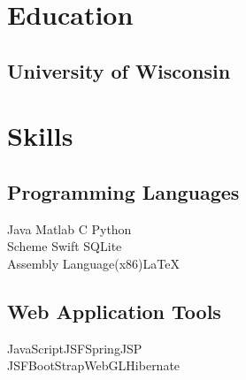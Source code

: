 \documentclass[]{deedy-resume-openfont}
\begin{document}
%
%
\lastupdated

%
%

%
%

\begin{minipage}[t]{0.33\textwidth} 


\section{Education} 

\subsection{University of Wisconsin}
\sectionsep





\section{Skills}
\subsection{Programming Languages}
Java \textbullet{} Matlab \textbullet{} C \textbullet{} Python \\ 
Scheme \textbullet{} Swift \textbullet{} SQLite 	\\
Assembly Language(x86)\textbullet{}\LaTeX\
\sectionsep

\subsection{Web Application Tools}
JavaScript\textbullet{}JSF\textbullet{}Spring\textbullet{}JSP\\
JSF\textbullet{}BootStrap\textbullet{}WebGL\textbullet{}Hibernate
\sectionsep


\end{minipage}
\end{document}
